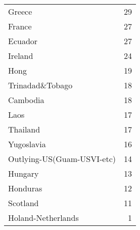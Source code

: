 \begin{table}
\begin{tabular}{lr}
 Greece                     &              29 \\
 France                     &              27 \\
 Ecuador                    &              27 \\
 Ireland                    &              24 \\
 Hong                       &              19 \\
 Trinadad\&Tobago            &              18 \\
 Cambodia                   &              18 \\
 Laos                       &              17 \\
 Thailand                   &              17 \\
 Yugoslavia                 &              16 \\
 Outlying-US(Guam-USVI-etc) &              14 \\
 Hungary                    &              13 \\
 Honduras                   &              12 \\
 Scotland                   &              11 \\
 Holand-Netherlands         &               1 \\
\bottomrule
\end{tabular}
\end{table}
